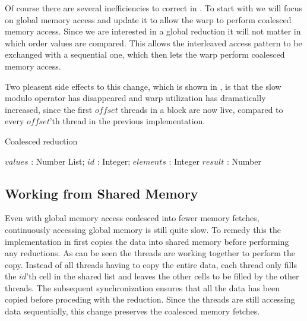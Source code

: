Of course there are several inefficiencies to correct in
. To start with we will focus on global memory access
and update it to allow the warp to perform coalesced memory access. Since we are
interested in a global reduction it will not matter in which order values are
compared. This allows the interleaved access pattern to be exchanged with a
sequential one, which then lets the warp perform coalesced memory access.


Two pleasent side effects to this change, which is shown in
, is that the slow modulo operator has disappeared
and warp utilization has dramatically increased, since the first $offset$
threads in a block are now live, compared to every $offset$'th thread in the
previous implementation.


\begin{algorithm}
  \caption{Coalesced reduction}
  \label{alg:coalescedReduct}
  \begin{algorithmic}
              {$values$ : Number List; $id$ : Integer; $elements$ : Integer}
              {$result$ : Number}
              {
                  \ENDIF
                  \SYNC
                \ENDWHILE
                \ENDIF
              }
  \end{algorithmic}
\end{algorithm}



\subsection{Working from Shared Memory}\label{sec:usingSharedMem}

Even with global memory access coalesced into fewer memory fetches, continuously
accessing global memory is still quite slow. To remedy this the implementation
in  first copies the data into shared memory before
performing any reductions. As can be seen the threads are working together to
perform the copy. Instead of all threads having to copy the entire data, each
thread only fills the $id$'th cell in the shared list and leaves the other cells
to be filled by the other threads. The subsequent synchronization ensures that
all the data has been copied before proceding with the reduction. Since the
threads are still accessing data sequentially, this change preserves the
coalesced memory fetches.

